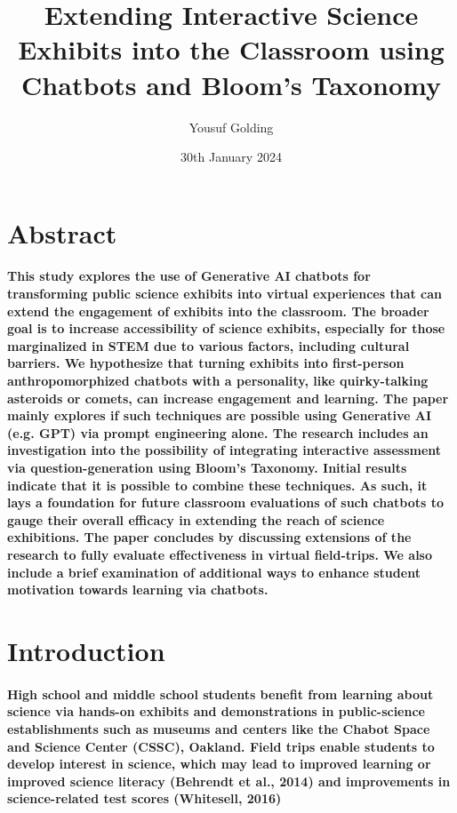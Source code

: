 \documentclass{article}
\title{Extending Interactive Science Exhibits into the Classroom using Chatbots and Bloom’s Taxonomy}
\author{Yousuf Golding }
\date{30th January 2024}
\begin{document}
\maketitle

\section*{Abstract}

\paragraph{This study explores the use of Generative AI chatbots for transforming public science exhibits into virtual experiences that can extend the engagement of exhibits into the classroom. The broader goal is to increase accessibility of science exhibits, especially for those marginalized in STEM due to various factors, including cultural barriers. We hypothesize that turning exhibits into first-person anthropomorphized chatbots with a personality, like quirky-talking asteroids or comets, can increase engagement and learning. The paper mainly explores if such techniques are possible using Generative AI (e.g. GPT) via prompt engineering alone. The research includes an investigation into the possibility of integrating interactive assessment via question-generation using Bloom’s Taxonomy. Initial results indicate that it is possible to combine these techniques. As such, it lays a foundation for future classroom evaluations of such chatbots to gauge their overall efficacy in extending the reach of science exhibitions. The paper concludes by discussing extensions of the research to fully evaluate effectiveness in virtual  field-trips. We also include a brief examination of additional ways to enhance student motivation towards learning via chatbots.}

\section*{Introduction}

\paragraph{High school and middle school students benefit from learning about science via hands-on exhibits and demonstrations in public-science establishments such as museums and centers like the Chabot Space and Science Center (CSSC), Oakland. Field trips enable students to develop interest in science, which may lead to improved learning or improved science literacy (Behrendt et al., 2014) and improvements in science-related test scores (Whitesell, 2016)}
\end{document}
